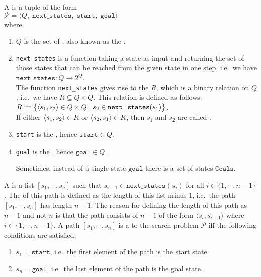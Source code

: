 \begin{Definition}
  A   is a tuple of the form
  \\[0.2cm]
  \hspace*{1.3cm}
  $\mathcal{P} = \langle Q,\;\mathtt{next\_states},\; \mathtt{start},\; \mathtt{goal}\rangle$
  \\[0.2cm]
  where
  \begin{enumerate}
  \item $Q$ is the set of , also known as the .
  \item \texttt{next\_states} is a function taking a state as input and returning the set of those
        states that can be reached from the given state in one step,
        i.e.~we have
        \\[0.2cm]
        \hspace*{1.3cm}
        $\texttt{next\_states}:Q \rightarrow 2^Q$.
        \\[0.2cm]
        The function \texttt{next\_states} gives rise to the  $R$, which is a
        binary relation on $Q$, i.e.~we have $R \subseteq Q \times Q$.  This relation is defined as follows:
        \\[0.2cm]
        \hspace*{1.3cm}
        $R := \bigl\{ \pair(s_1, s_2) \in Q \times Q \mid s_2 \in \mathtt{next\_states}(s_1) \bigr\}$.
        \\[0.2cm]
        If either $\pair(s_1, s_2) \in R$ or $\pair(s_2, s_1) \in R$, then  $s_1$ and $s_2$ are
        called .
  \item \texttt{start} is the , hence $\mathtt{start} \in Q$.
  \item \texttt{goal} is the , hence $\mathtt{goal} \in Q$.
    
        Sometimes, instead of a single state $\texttt{goal}$ there is a set of states $\texttt{Goals}$.
  \end{enumerate}
  A   is a list $[s_1, \cdots, s_n]$ such that $s_{i+1} \in \mathtt{next\_states}(s_i)$ for all $i \in
  \{1,\cdots,n-1\}$.
  The  of this path is defined as the length of this list minus 1, i.e.~the path  
  $[s_1, \cdots, s_n]$ has length $n-1$.  The reason for defining the length of this path as $n-1$ and not $n$ 
  is that the path consists of $n-1$   of the form $\langle s_i, s_{i+1} \rangle$ where
  $i \in \{1, \cdots, n-1\}$.
  A path $[s_1, \cdots, s_n]$ is a  
  to the search problem $\mathcal{P}$ iff 
  the following conditions are satisfied:
  \begin{enumerate}
  \item $s_1 = \mathtt{start}$, i.e.~the first element of the path is the start state.
  \item $s_n = \mathtt{goal}$, i.e.~the last element of the path is the goal state.


\end{enumerate}
\end{Definition}
